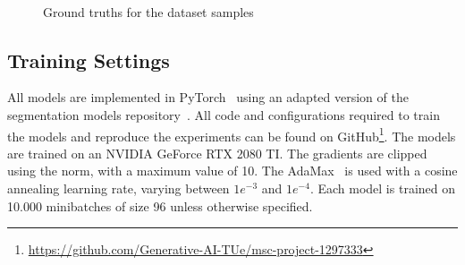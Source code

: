 \begin{figure}
    \centering
    \\
    \caption{\label{fig:coco-samples}Ground truths for the dataset samples}
\end{figure}


\subsection{Training Settings}
All models are implemented in PyTorch~\cite{Ansel_PyTorch_2_Faster_2024} using an adapted version of the segmentation models repository~\cite{Iakubovskii:2019}. All code and configurations required to train the models and reproduce the experiments can be found on GitHub\footnote[1]{\url{https://github.com/Generative-AI-TUe/msc-project-1297333}}. The models are trained on an NVIDIA GeForce RTX 2080 TI. The gradients are clipped using the norm, with a maximum value of 10. The AdaMax~\cite{kingma2017adammethodstochasticoptimization} is used with a cosine annealing learning rate, varying between $1e^{-3}$ and $1e^{-4}$. Each model is trained on 10.000 minibatches of size 96 unless otherwise specified.

